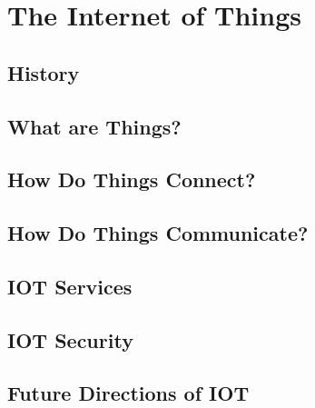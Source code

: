 \chapter{The Internet of Things} 


\section{History}
\section{What are Things?}
\section{How Do Things Connect?}
\section{How Do Things Communicate?}
\section{IOT Services}
\section{IOT Security}
\section{Future Directions of IOT}











%


